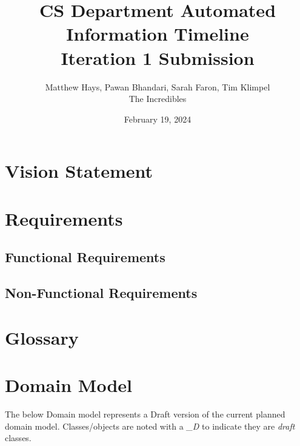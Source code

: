 \documentclass{article}
\title{CS Department Automated Information Timeline \\ Iteration 1 Submission}
\date{February 19, 2024}
\author{Matthew Hays, Pawan Bhandari, Sarah Faron, Tim Klimpel \\ The Incredibles}
\begin{document}
\maketitle
\newpage
\tableofcontents
\listoffigures
\newpage
\section{Vision Statement}


\section{Requirements}
\subsection{Functional Requirements}


\subsection{Non-Functional Requirements}


\section{Glossary} \label{sec:Glossary}


\section{Domain Model}

The below Domain model represents a Draft version of the current planned domain model.  Classes/objects are noted with a \textit{\_D} to indicate they are \textit{draft} classes.
\end{document}
